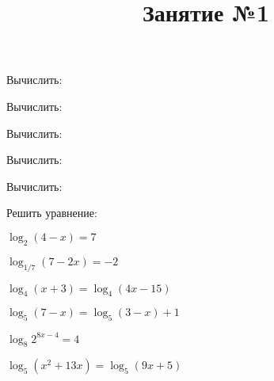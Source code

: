 \title{Занятие №1}
\begin{listofex}
	\item Вычислить:
	\begin{enumcols}[itemcolumns=3]
		\item {}
		\item {}
		\item {}
		\item {}
		\item {}
	\end{enumcols}
	\item Вычислить:
	\begin{enumcols}[itemcolumns=3]
		\item {}
		\item {}
		\item {}
	\end{enumcols}
	\item Вычислить:
	\begin{enumcols}[itemcolumns=3]
		\item {}
		\item {}
		\item {}
		\item {}
		\item {}
		\item {}
		\item {}
	\end{enumcols}
	\item Вычислить:
	\begin{enumcols}[itemcolumns=2]
		\item {}
		\item {}
		\item {}
		\item {}
	\end{enumcols}
	\item Вычислить:
	\begin{enumcols}[itemcolumns=2]
		\item {}
		\item {}
		\item {}
		\item {}
		\item {}
		\item {}
	\end{enumcols}
	\item Решить уравнение:
	\begin{enumcols}[itemcolumns=2]
		\item \( \log_2(4-x)=7 \)
		\item \( \log_{1/7}(7-2x)=-2 \)
		\item \( \log_4(x+3)=\log_4(4x-15) \)
		\item \( \log_5(7-x)=\log_5(3-x)+1 \)
		\item \( \log_8 2^{8x-4}=4 \)
		\item \( \log_5(x^2+13x)=\log_5(9x+5) \)
	\end{enumcols}
\end{listofex}
